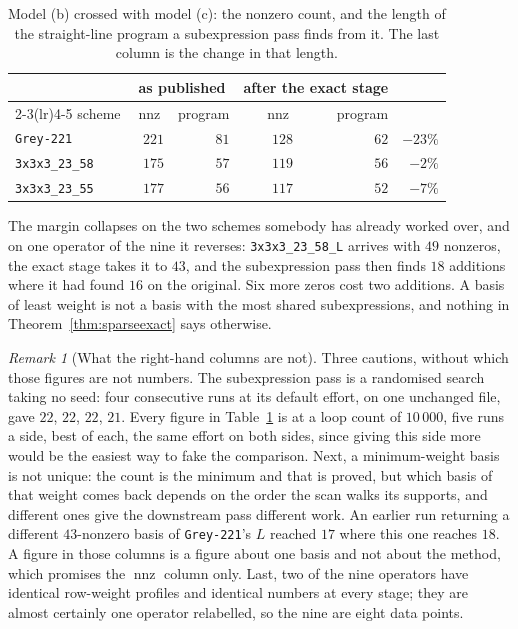 \documentclass[11pt,reqno]{amsart}
\theoremstyle{plain}
\theoremstyle{definition}
\theoremstyle{remark}
\newtheorem{remark}[theorem]{Remark}
\newcommand{\nnz}{\operatorname{nnz}}
\begin{document}
\begin{table}[ht]
\centering
\begin{tabular}{lrrrrr}
\toprule
 & \multicolumn{2}{c}{as published} & \multicolumn{2}{c}{after the exact stage} & \\
\cmidrule(lr){2-3}\cmidrule(lr){4-5}
scheme & $\nnz$ & program & $\nnz$ & program & \\
\midrule
\texttt{Grey-221}      & $221$ & $81$ & $128$ & $62$ & $-23\%$ \\
\texttt{3x3x3\_23\_58} & $175$ & $57$ & $119$ & $56$ & $-2\%$  \\
\texttt{3x3x3\_23\_55} & $177$ & $56$ & $117$ & $52$ & $-7\%$  \\
\bottomrule
\end{tabular}
\vspace{0.5em}
\caption{Model (b) crossed with model (c): the nonzero count, and the length of
the straight-line program a subexpression pass finds from it. The last column is
the change in that length.}\label{tab:cse}
\end{table}

The margin collapses on the two schemes somebody has already worked over, and on
one operator of the nine it reverses: \texttt{3x3x3\_23\_58\_L} arrives with $49$
nonzeros, the exact stage takes it to $43$, and the subexpression pass then finds
$18$ additions where it had found $16$ on the original. Six more zeros cost two
additions. A basis of least weight is not a basis with the most shared
subexpressions, and nothing in Theorem~\ref{thm:sparseexact} says otherwise.

\begin{remark}[What the right-hand columns are not]
Three cautions, without which those figures are not numbers. The subexpression
pass is a randomised search taking no seed: four consecutive runs at its default
effort, on one unchanged file, gave $22$, $22$, $22$, $21$. Every figure in
Table~\ref{tab:cse} is at a loop count of $10\,000$, five runs a side, best of
each, the same effort on both sides, since giving this side more would be the
easiest way to fake the comparison. Next, a minimum-weight basis is not unique:
the count is the minimum and that is proved, but which basis of that weight comes
back depends on the order the scan walks its supports, and different ones give
the downstream pass different work. An earlier run returning a different
$43$-nonzero basis of \texttt{Grey-221}'s $L$ reached $17$ where this one reaches
$18$. A figure in those columns is a figure about one basis and not about the
method, which promises the $\nnz$ column only. Last, two of the nine operators
have identical row-weight profiles and identical numbers at every stage; they are
almost certainly one operator relabelled, so the nine are eight data points.
\end{remark}
\end{document}
